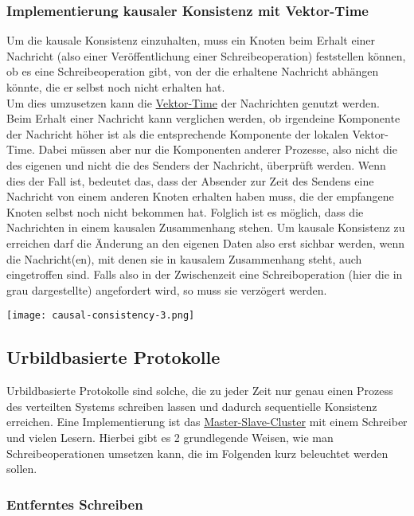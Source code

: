 \subsubsection*{Implementierung kausaler Konsistenz mit Vektor-Time}

Um die kausale Konsistenz einzuhalten, muss ein Knoten beim Erhalt einer Nachricht (also einer Veröffentlichung einer Schreibeoperation) feststellen können, ob es eine Schreibeoperation gibt, von der die erhaltene Nachricht abhängen könnte, die er selbst noch nicht erhalten hat. \\
Um dies umzusetzen kann die  \hyperref[sec:vector-time]{Vektor-Time} der Nachrichten genutzt werden. Beim Erhalt einer Nachricht kann verglichen werden, ob irgendeine Komponente der Nachricht höher ist als die entsprechende Komponente der lokalen Vektor-Time. Dabei müssen aber nur die Komponenten anderer Prozesse, also nicht die des eigenen und nicht die des Senders der Nachricht, überprüft werden. Wenn dies der Fall ist, bedeutet das, dass der Absender zur Zeit des Sendens eine Nachricht von einem anderen Knoten erhalten haben muss, die der empfangene Knoten selbst noch nicht bekommen hat. Folglich ist es möglich, dass die Nachrichten in einem kausalen Zusammenhang stehen. Um kausale Konsistenz zu erreichen darf die Änderung an den eigenen Daten also erst sichbar werden, wenn die Nachricht(en), mit denen sie in kausalem Zusammenhang steht, auch eingetroffen sind. Falls also in der Zwischenzeit eine Schreiboperation (hier die in grau dargestellte) angefordert wird, so muss sie verzögert werden.

\texttt{[image: causal-consistency-3.png]}


\subsection{Urbildbasierte Protokolle}

Urbildbasierte Protokolle sind solche, die zu jeder Zeit nur genau einen Prozess des verteilten Systems schreiben lassen und dadurch sequentielle Konsistenz erreichen. Eine Implementierung ist das \hyperref[sec:master-slave]{Master-Slave-Cluster} mit einem Schreiber und vielen Lesern. Hierbei gibt es 2 grundlegende Weisen, wie man Schreibeoperationen umsetzen kann, die im Folgenden kurz beleuchtet werden sollen.

\subsubsection{Entferntes Schreiben}

